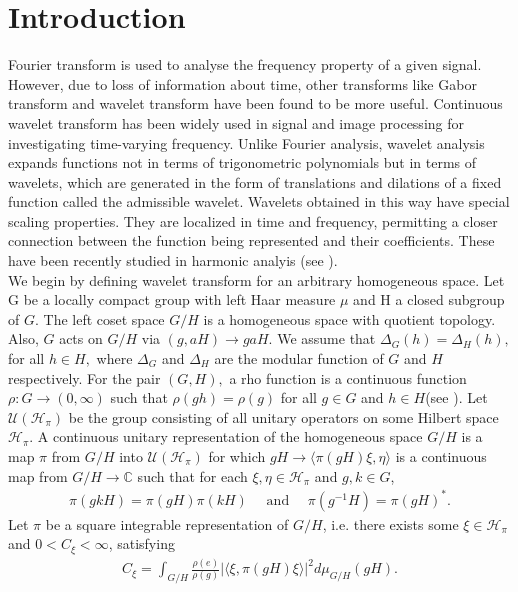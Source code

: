 \documentclass[11pt,reqno]{amsart}
\numberwithin{equation}{section}
\theoremstyle{definition}
\begin{document}
\section{Introduction}
\noindent Fourier transform is used to analyse the frequency property of a given signal. However, due to loss of information about time, other transforms like Gabor transform and wavelet transform have been found to be more useful. Continuous wavelet transform has been widely used in signal and image processing for investigating time-varying frequency.  Unlike Fourier analysis, wavelet analysis expands functions not in terms of trigonometric polynomials but in terms of wavelets, which are generated in the form of translations and dilations of a fixed function called the admissible wavelet. Wavelets obtained in this way have special scaling properties. They are localized in time and frequency, permitting a closer connection between the function being represented and their coefficients. These have been recently studied in harmonic analyis (see \cite{ali;00,Dav:96,fuhr;05,kam:12,Liu:09}).\\
 We  begin by defining wavelet transform for an arbitrary homogeneous space.
Let G be a locally compact group with left Haar measure $\mu$ and H a closed subgroup of $G$. The left coset space $G/H$ is a homogeneous space with quotient topology. Also, $G$ acts on $G/H$ via $(g,aH) \to  gaH$. We assume that $\Delta_G(h)= \Delta_H(h),$ for all $h\in H,$ where $\Delta_G$ and $\Delta_H$ are the modular function of $G$ and $H$ respectively.
For the pair $(G,H),$ a rho function is  a continuous function $\rho: G \to (0,\infty)$ such that $\rho(gh)= \rho(g)$ for all $g\in G$ and $h\in H$(see \cite[p. 65]{fol}).
 Let $\mathcal{U}(\mathcal{H}_{\pi})$ be the group consisting of all unitary operators on some Hilbert space $\mathcal{H}_{\pi}$. A continuous unitary representation of the homogeneous space $G/H$  is a map $\pi$ from $G/H$ into $\mathcal{U}(\mathcal{H}_{\pi})$ for which $gH \to \langle \pi(gH)\xi, \eta \rangle  $ is a continuous map from $G/H \to \mathbb{C}$ such that for each $\xi,\eta \in \mathcal{H}_{\pi}$ and  $g,k \in G$,
 \begin{align*}
 \pi(gkH) = \pi(gH)\pi(kH)\quad \text{ and } \quad  \pi(g^{-1}H) = \pi(gH)^*.
 \end{align*} 
 Let $\pi$ be a square integrable representation of $G/H$, i.e.  there exists some $\xi \in \mathcal{H}_{\pi}$ and $0< C_{\xi} < \infty$, satisfying 
 \begin{align}\label{eq1}
C_{\xi} =  \int_{G/H} \frac{\rho(e)}{\rho(g)}|\langle \xi, \pi(gH)\xi \rangle|^{2} d\mu_{G/H}(gH).
\end{align}
\end{document}
